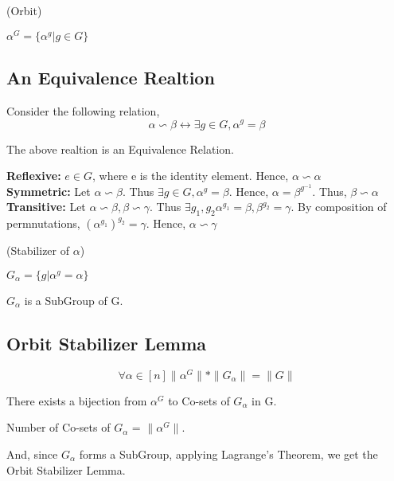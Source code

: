 \begin{definition}(Orbit)
\begin{center}
$\alpha^G = \{\alpha^g | g \in G\}$
\end{center}
\end{definition}

\subsection{An Equivalence Realtion}
Consider the following relation,
\[\alpha \backsim \beta \leftrightarrow \exists g \in G, \alpha^g = \beta\]

\begin{claim}
The above realtion is an Equivalence Relation. 
\end{claim}
\textbf{Reflexive:} $e \in G$, where e is the identity element. Hence, $\alpha \backsim \alpha$ \\
\textbf{Symmetric:} Let $\alpha \backsim \beta$. Thus $\exists g \in G, \alpha^g = \beta$. Hence, $\alpha = \beta^{g^{-1}}$. Thus, $\beta \backsim \alpha$ \\
\textbf{Transitive:} Let $\alpha \backsim \beta, \beta \backsim \gamma$. Thus $\exists g_1, g_2 \alpha^{g_1} = \beta, \beta^{g_2} = \gamma$. By composition of permnutations, $(\alpha^{g_1})^{g_2} = \gamma$. Hence, $\alpha \backsim \gamma$


\begin{definition}(Stabilizer of $\alpha$)
\begin{center}
$G_{\alpha} = \{g | \alpha^g = \alpha\}$
\end{center}
\end{definition}

\begin{observation}
$G_{\alpha}$ is a SubGroup of G.
\end{observation}

\subsection{Orbit Stabilizer Lemma}
\[\forall \alpha \in [n] \|\alpha^G\|*\|G_{\alpha}\| = \|G\| \]
\begin{claim}
There exists a bijection from $\alpha^G$ to Co-sets of $G_{\alpha}$ in G.
\end{claim}
\begin{corollary}
Number of Co-sets of $G_{\alpha}$ = $\|\alpha^G\|$.
\end{corollary}
And, since $G_{\alpha}$ forms a SubGroup, applying Lagrange's Theorem, we get the Orbit Stabilizer Lemma.

